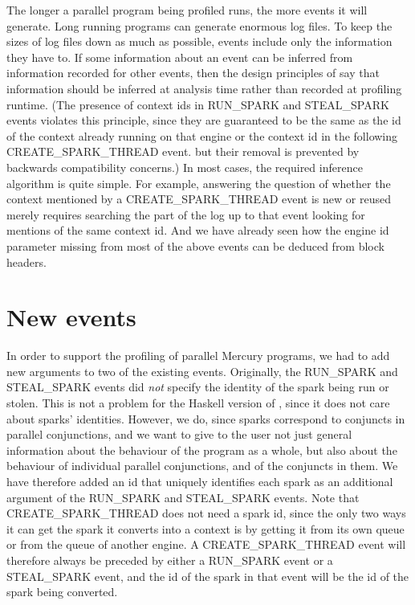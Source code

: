 \noindent
The longer a parallel program being profiled runs,
the more events it will generate.
Long running programs can generate enormous log files.
To keep the sizes of log files down as much as possible,
events include only the information they have to.
If some information about an event
can be inferred from information recorded for other events,
then the design principles of \tscope say
that information should be inferred at analysis time
rather than recorded at profiling runtime.
(The presence of context ids in RUN\_SPARK and STEAL\_SPARK events
violates this principle,
since they are guaranteed to be the same as the id of the context already
running on that engine or
the context id in the following CREATE\_SPARK\_THREAD event.
but their removal is prevented by backwards compatibility concerns.)
In most cases, the required inference algorithm is quite simple.
For example, answering the question of whether the context
mentioned by a CREATE\_SPARK\_THREAD event is new or reused
merely requires searching the part of the log up to that event
looking for mentions of the same context id.
And we have already seen how the engine id parameter
missing from most of the above events
can be deduced from block headers.

\section{New events}
\label{sec:newevents}

In order to support the profiling of parallel Mercury programs,
we had to add new arguments to two of the existing \tscope events.
Originally, the RUN\_SPARK and STEAL\_SPARK events
did \emph{not} specify the identity of the spark being run or stolen.
This is not a problem for the Haskell version of \tscope,
since it does not care about sparks' identities.
However, we do, since sparks correspond to conjuncts in parallel conjunctions,
and we want to give to the user not just general information
about the behaviour of the program as a whole,
but also about the behaviour of individual parallel conjunctions,
and of the conjuncts in them.
We have therefore added an id that uniquely identifies each spark
as an additional argument of the RUN\_SPARK and STEAL\_SPARK events.
Note that CREATE\_SPARK\_THREAD does not need a spark id,
since the only two ways it can get the spark it converts into a context
is by getting it from its own queue or from the queue of another engine.
A CREATE\_SPARK\_THREAD event will therefore always be preceded
by either a RUN\_SPARK event or a STEAL\_SPARK event,
and the id of the spark in that event
will be the id of the spark being converted.

